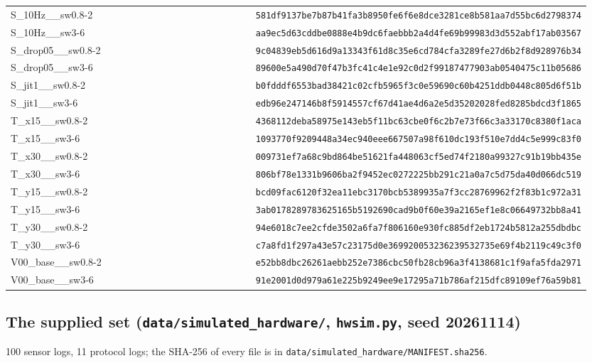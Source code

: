{\begin{longtable}{p{0.475\linewidth}p{0.475\linewidth}}
S\_10Hz\_\_sw0.8-2 & \texttt{581df9137be7b87b41fa3b8950fe6f6e8dce3281ce8b581aa7d55bc6d2798374} \\
S\_10Hz\_\_sw3-6 & \texttt{aa9ec5d63cddbe0888e4b9dc6faebbb2a4d4fe69b99983d3d552abf17ab03567} \\
S\_drop05\_\_sw0.8-2 & \texttt{9c04839eb5d616d9a13343f61d8c35e6cd784cfa3289fe27d6b2f8d928976b34} \\
S\_drop05\_\_sw3-6 & \texttt{89600e5a490d70f47b3fc41c4e1e92c0d2f99187477903ab0540475c11b05686} \\
S\_jit1\_\_sw0.8-2 & \texttt{b0fdddf6553bad38421c02cfb5965f3c0e59690c60b4251ddb0448c805d6f51b} \\
S\_jit1\_\_sw3-6 & \texttt{edb96e247146b8f5914557cf67d41ae4d6a2e5d35202028fed8285bdcd3f1865} \\
T\_x15\_\_sw0.8-2 & \texttt{4368112deba58975e143eb5f11bc63cbe0f6c2b7e73f66c3a33170c8380f1aca} \\
T\_x15\_\_sw3-6 & \texttt{1093770f9209448a34ec940eee667507a98f610dc193f510e7dd4c5e999c83f0} \\
T\_x30\_\_sw0.8-2 & \texttt{009731ef7a68c9bd864be51621fa448063cf5ed74f2180a99327c91b19bb435e} \\
T\_x30\_\_sw3-6 & \texttt{806bf78e1331b9606ba2f9452ec0272225bb291c21a0a7c5d75da40d066dc519} \\
T\_y15\_\_sw0.8-2 & \texttt{bcd09fac6120f32ea11ebc3170bcb5389935a7f3cc28769962f2f83b1c972a31} \\
T\_y15\_\_sw3-6 & \texttt{3ab0178289783625165b5192690cad9b0f60e39a2165ef1e8c06649732bb8a41} \\
T\_y30\_\_sw0.8-2 & \texttt{94e6018c7ee2cfde3502a6fa7f806160e930fc885df2eb1724b5812a255dbdbc} \\
T\_y30\_\_sw3-6 & \texttt{c7a8fd1f297a43e57c23175d0e369920053236239532735e69f4b2119c49c3f0} \\
V00\_base\_\_sw0.8-2 & \texttt{e52bb8dbc26261aebb252e7386cbc50fb28cb96a3f4138681c1f9afa5fda2971} \\
V00\_base\_\_sw3-6 & \texttt{91e2001d0d979a61e225b9249ee9e17295a71b786af215dfc89109ef76a59b81} \\
\bottomrule
\end{longtable}}

\subsection*{The supplied set (\texttt{data/simulated\_hardware/}, \texttt{hwsim.py}, seed 20261114)}

100 sensor logs, 11 protocol logs; the SHA-256 of every file is in \texttt{data/simulated\_hardware/MANIFEST.sha256}.

